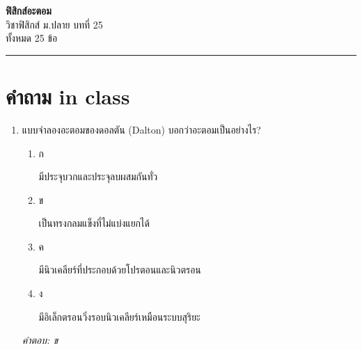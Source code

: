 \documentclass[12pt]{article}
\begin{document}
\begin{center}
{\Large\textbf{ฟิสิกส์อะตอม}}\\[6pt]
{\normalsize วิชาฟิสิกส์ ม.ปลาย บทที่ 25}\\[4pt]
{\footnotesize ทั้งหมด 25 ข้อ}
\end{center}
\hrule
\bigskip

\section*{คำถาม in class}
\begin{enumerate}[label=\arabic*., itemsep=0.5\baselineskip, topsep=0.5\baselineskip, leftmargin=*]
\item แบบจำลองอะตอมของดอลตัน (Dalton) บอกว่าอะตอมเป็นอย่างไร?
\begin{enumerate}[label=\alph*)., itemsep=0.3\baselineskip, topsep=0.3\baselineskip]
\item ก\ 
\begin{minipage}[t]{0.9\linewidth}
\raggedright มีประจุบวกและประจุลบผสมกันทั่ว
\end{minipage}
\item ข\ 
\begin{minipage}[t]{0.9\linewidth}
\raggedright เป็นทรงกลมแข็งที่ไม่แบ่งแยกได้
\end{minipage}
\item ค\ 
\begin{minipage}[t]{0.9\linewidth}
\raggedright มีนิวเคลียร์ที่ประกอบด้วยโปรตอนและนิวตรอน
\end{minipage}
\item ง\ 
\begin{minipage}[t]{0.9\linewidth}
\raggedright มีอิเล็กตรอนวิ่งรอบนิวเคลียร์เหมือนระบบสุริยะ
\end{minipage}
\end{enumerate}
\vspace{-0.3\baselineskip}
\begin{small}
\textit{คำตอบ: ข}
\end{small}


\end{enumerate}
\end{document}
